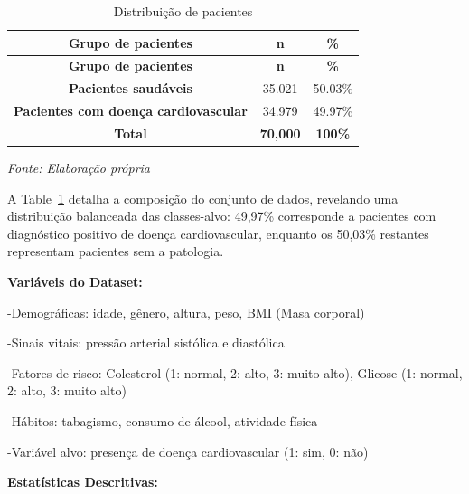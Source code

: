 \documentclass[
  oneclumn]{article}
\begin{document}
\begin{longtable}[]{@{}ccc@{}}
\caption{Distribuição de
pacientes}\label{tbl-distribucion}\tabularnewline
\toprule\noalign{}
\textbf{Grupo de pacientes} & \textbf{n} & \textbf{\%} \\
\midrule\noalign{}
\endfirsthead
\toprule\noalign{}
\textbf{Grupo de pacientes} & \textbf{n} & \textbf{\%} \\
\midrule\noalign{}
\endhead
\bottomrule\noalign{}
\endlastfoot
\textbf{Pacientes saudáveis} & 35.021 & 50.03\% \\
\textbf{Pacientes com doença cardiovascular} & 34.979 & 49.97\% \\
\textbf{Total} & \textbf{70,000} & \textbf{100\%} \\
\end{longtable}

\begin{center}
\footnotesize \textit{Fonte: Elaboração própria}
\end{center}

A Table~\ref{tbl-distribucion} detalha a composição do conjunto de
dados, revelando uma distribuição balanceada das classes-alvo: 49,97\%
corresponde a pacientes com diagnóstico positivo de doença
cardiovascular, enquanto os 50,03\% restantes representam pacientes sem
a patologia.

\textbf{Variáveis do Dataset:}

-Demográficas: idade, gênero, altura, peso, BMI (Masa corporal)

-Sinais vitais: pressão arterial sistólica e diastólica

-Fatores de risco: Colesterol (1: normal, 2: alto, 3: muito alto),
Glicose (1: normal, 2: alto, 3: muito alto)

-Hábitos: tabagismo, consumo de álcool, atividade física

-Variável alvo: presença de doença cardiovascular (1: sim, 0: não)

\textbf{Estatísticas Descritivas:}
\end{document}
